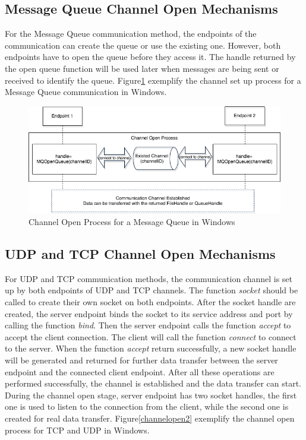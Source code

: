 \subsection{Message Queue Channel Open Mechanisms} 
For the Message Queue communication method, the endpoints of the communication can create the queue or use the existing one. However, both endpoints have to open the queue before they access it. The handle returned by the open queue function will be used later when messages are being sent or received to identify the queue. Figure\ref{msmqopen} exemplify the channel set up process for a Message Queue communication in Windows.
\begin{figure}[H]
\centerline{\includegraphics[scale=0.45]{Figures/msmqchannelopen}}
 \caption{Channel Open Process for a Message Queue in Windows}
\label{msmqopen}
\end{figure}

\subsection{UDP and TCP Channel Open Mechanisms} 
For UDP and TCP communication methods, the communication channel is set up by both endpoints of UDP and TCP channels. The function \textit{socket} should be called to create their own socket on both endpoints. After the socket handle are created, the server endpoint binds the socket to its service address and port by calling the function \textit{bind}. Then the server endpoint calls the function  \textit{accept} to accept the client connection. The client will call the function \textit{connect} to connect to the server. When the function \textit{accept} return successfully, a new socket handle will be generated and returned for further data transfer between the server endpoint and  the connected client endpoint. After all these operations are performed successfully, the channel is established and the data transfer can start. During the channel open stage, server endpoint has two socket handles, the first one is used to listen to the connection from the client, while the second one is created for real data transfer. Figure\ref{channelopen2} exemplify the channel open process for TCP and UDP  in Windows.
    
